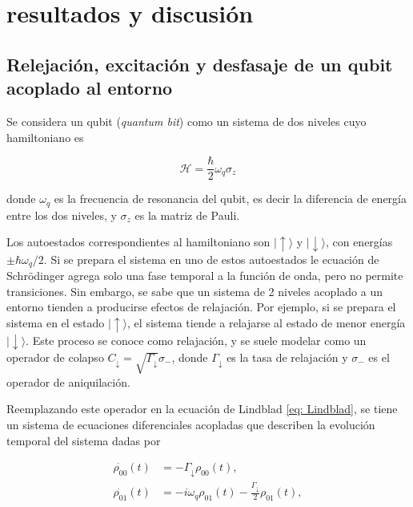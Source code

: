 \section{resultados y discusión}

\subsection{Relejación, excitación y desfasaje de un qubit acoplado al entorno} \label{sec: one_qubit}

Se considera un qubit (\textit{quantum bit}) como un sistema de dos niveles cuyo hamiltoniano es

\begin{equation} \label{eq: h_qubit}
    \mathcal{H} = \frac{\hbar}{2} \omega_q \sigma_z
\end{equation}

\noindent donde \(\omega_q\) es la frecuencia de resonancia del qubit, es decir la diferencia de energía entre los dos niveles, y \(\sigma_z\) es la matriz de Pauli.

Los autoestados correspondientes al hamiltoniano son \(|\uparrow\rangle\) y \(|\downarrow\rangle\), con energías \(\pm \hbar \omega_q / 2\). Si se prepara el sistema en uno de estos autoestados le ecuación de Schrödinger agrega solo una fase temporal a la función de onda, pero no permite transiciones. Sin embargo, se sabe que un sistema de 2 niveles acoplado a un entorno tienden a producirse efectos de relajación. Por ejemplo, si se prepara el sistema en el estado \(|\uparrow\rangle\), el sistema tiende a relajarse al estado de menor energía \(|\downarrow\rangle\). Este proceso se conoce como relajación, y se suele modelar como un operador de colapso \(C_\downarrow = \sqrt{\Gamma_\downarrow} \sigma_-\), donde \(\Gamma_\downarrow\) es la tasa de relajación y \(\sigma_-\) es el operador de aniquilación. 

Reemplazando este operador en la ecuación de Lindblad \ref{eq: Lindblad}, se tiene un sistema de ecuaciones diferenciales acopladas que describen la evolución temporal del sistema dadas por

\begin{align}
    \dot{\rho_{00}}(t) &= -\Gamma_\downarrow \rho_{00}(t), \label{eq: p00_relajacion_dif} \\
    \dot{\rho_{01}}(t) &= -i \omega_q \rho_{01}(t) - \frac{\Gamma_\downarrow}{2} \rho_{01}(t), \label{eq: p01_relajacion_dif}
\end{align}

